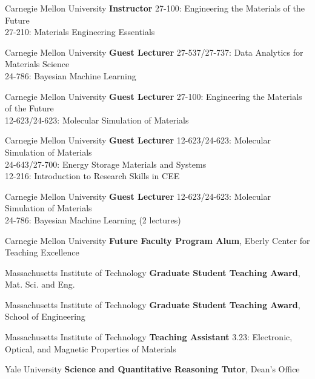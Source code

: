 \vspace{-1mm}
    {Carnegie Mellon University}
    {\textbf{Instructor}}
    {27-100: Engineering the Materials of the Future\\
    27-210: Materials Engineering Essentials}

\vspace{-3mm}
\datedsubsection{}
    {Carnegie Mellon University}
    {\textbf{Guest Lecturer}}
    {27-537/27-737: Data Analytics for Materials Science\\
    24-786: Bayesian Machine Learning}

\vspace{-3mm}
    {Carnegie Mellon University}
    {\textbf{Guest Lecturer}}
    {27-100: Engineering the Materials of the Future\\
    12-623/24-623: Molecular Simulation of Materials}

\vspace{-3mm}
    {Carnegie Mellon University}
    {\textbf{Guest Lecturer}}
    {12-623/24-623: Molecular Simulation of Materials\\
    24-643/27-700: Energy Storage Materials and Systems\\
    12-216: Introduction to Research Skills in CEE}

\vspace{-3mm}
    {Carnegie Mellon University}
    {\textbf{Guest Lecturer}}
    {12-623/24-623: Molecular Simulation of Materials\\
    24-786: Bayesian Machine Learning (2 lectures)}

\vspace{2.2mm}
\datedsubsectionnarrow{}
    {Carnegie Mellon University}
    {\textbf{Future Faculty Program Alum}, Eberly Center for Teaching Excellence}{}

\vspace{2.2mm}
    {Massachusetts Institute of Technology}
    {\textbf{Graduate Student Teaching Award}, Mat. Sci. and Eng.}{}

\datedsubsectionnarrow{}
    {Massachusetts Institute of Technology}
    {\textbf{Graduate Student Teaching Award}, School of Engineering}{}

\vspace{-3mm}
    {Massachusetts Institute of Technology}
    {\textbf{Teaching Assistant}}
    {3.23: Electronic, Optical, and Magnetic Properties of Materials}

\vspace{2.2mm}
    {Yale University}
    {\textbf{Science and Quantitative Reasoning Tutor}, Dean's Office}{}
